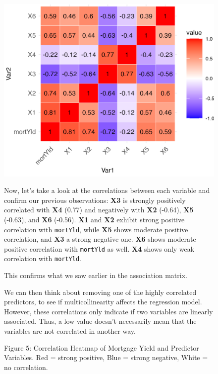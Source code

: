 \documentclass[
  12pt,
]{article}
\begin{document}
\begin{figure}[H]
\centering
\begin{minipage}{0.39\textwidth}
\includegraphics[width=\linewidth]{figures/Figure 5.png}
\captionsetup{font=normalsize}
\caption*{Figure 5: Correlation Heatmap of Mortgage Yield and Predictor Variables. Red = strong positive, Blue = strong negative, White = no correlation.}
\end{minipage}
\hfill
\begin{minipage}{0.59\textwidth}
\vspace{-1cm}
\small
Now, let's take a look at the correlations between each variable and confirm our previous observations:
\textbf{X3} is strongly positively correlated with \textbf{X4} (0.77) and negatively with \textbf{X2} (-0.64), \textbf{X5} (-0.63), and \textbf{X6} (-0.56).
\textbf{X1} and \textbf{X2} exhibit strong positive correlation with \texttt{mortYld}, while \textbf{X5} shows moderate positive correlation, and \textbf{X3} a strong negative one. \textbf{X6} shows moderate positive correlation with \texttt{mortYld} as well. \textbf{X4} shows only weak correlation with \texttt{mortYld}.


This confirms what we saw earlier in the association matrix.

We can then think about removing one of the highly correlated
predictors, to see if multicollinearity affects the regression model.
However, these correlations only indicate if two variables are linearly
associated. Thus, a low value doesn't necessarily mean that the
variables are not correlated in another way.
\end{minipage}


\end{figure}
\end{document}
